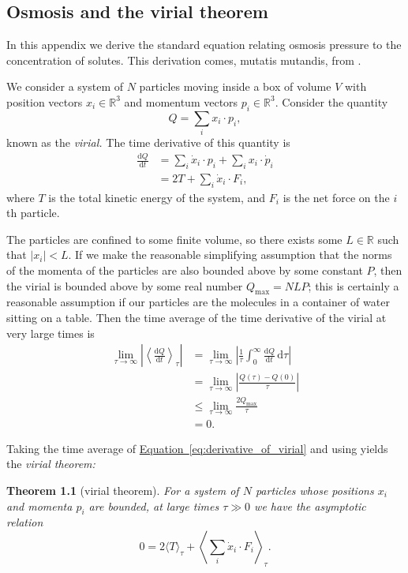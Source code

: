\documentclass[a4paper,12pt]{scrreprt}
\newcommand{\tder}[2]{\frac{\text{d} #1}{\text{d} #2}}
\renewcommand{\d}{\mathrm{d}}
\newcommand{\R}{\mathbb{R}}
\newcommand{\abs}[1]{\left| #1 \right|}
\theoremstyle{definition}
\theoremstyle{plain}
\newtheorem{theorem}{Theorem}[section]
\theoremstyle{remark}
\begin{document}
\begin{appendices}
  \chapter{Osmosis and the virial theorem}
  \label{ch:the_virial_theorem}

  In this appendix we derive the standard equation relating osmosis pressure to the concentration of solutes. This derivation comes, mutatis mutandis, from \cite{whatisosmosis}.

  We consider a system of $N$ particles moving inside a box of volume $V$ with position vectors $x_{i} \in \R^{3}$ and momentum vectors $p_{i} \in \R^{3}$. Consider the quantity
  \begin{equation*}
    Q = \sum_{i} x_{i} \cdot p_{i},
  \end{equation*}
  known as the \emph{virial.}
  The time derivative of this quantity is
  \begin{align}
    \tder{Q}{t} &= \sum_{i} \dot{x}_{i} \cdot p_{i} + \sum_{i} x_{i} \cdot \dot{p}_{i} \\
    \label{eq:derivative_of_virial}
    &= 2 T + \sum_{i} \dot{x}_{i} \cdot F_{i},
  \end{align}
  where $T$ is the total kinetic energy of the system, and $F_{i}$ is the net force on the $i$th particle.

  The particles are confined to some finite volume, so there exists some $L \in \R$ such that $\abs{x_{i}} < L$. If we make the reasonable simplifying assumption that the norms of the momenta of the particles are also bounded above by some constant $P$, then the virial is bounded above by some real number $Q_{\mathrm{max}} = NLP$; this is certainly a reasonable assumption if our particles are the molecules in a container of water sitting on a table. Then the time average of the time derivative of the virial at very large times is
  \begin{align}
    \lim_{\tau \to \infty} \left|\left\langle \tder{Q}{t} \right\rangle_{\tau}\right| &= \lim_{\tau \to \infty} \left| \frac{1}{\tau} \int_{0}^{\infty} \tder{Q}{t} \, \d \tau\right| \\
    &= \lim_{\tau \to \infty} \left| \frac{Q(\tau) - Q(0)}{\tau} \right| \\
    &\leq \lim_{\tau \to \infty} \frac{2Q_{\mathrm{max}}}{\tau} \\
    \label{eq:time_average_vanishes}
    &= 0.
  \end{align}

  Taking the time average of \hyperref[eq:derivative_of_virial]{Equation~\ref*{eq:derivative_of_virial}} and using  yields the \emph{virial theorem:}
  \begin{theorem}[virial theorem]
    For a system of $N$ particles whose positions $x_{i}$ and momenta $p_{i}$ are bounded, at large times $\tau \gg 0$ we have the asymptotic relation
    \begin{equation}
      \label{eq:virial_theorem}
      0 = 2\langle T \rangle_{\tau} + \left\langle \sum_{i} \dot{x}_{i} \cdot F_{i}\right\rangle_{\tau}.
    \end{equation}
  \end{theorem}
\end{appendices}
\end{document}
